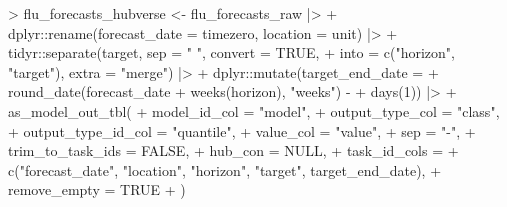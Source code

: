 \documentclass[
  letterpaper,
  DIV=11,
  numbers=noendperiod]{scrartcl}
\newenvironment{Shaded}{\begin{snugshade}}{\end{snugshade}}
\newcommand{\AttributeTok}[1]{\textcolor[rgb]{0.40,0.45,0.13}{#1}}
\newcommand{\ConstantTok}[1]{\textcolor[rgb]{0.56,0.35,0.01}{#1}}
\newcommand{\DecValTok}[1]{\textcolor[rgb]{0.68,0.00,0.00}{#1}}
\newcommand{\FunctionTok}[1]{\textcolor[rgb]{0.28,0.35,0.67}{#1}}
\newcommand{\NormalTok}[1]{\textcolor[rgb]{0.00,0.23,0.31}{#1}}
\newcommand{\OtherTok}[1]{\textcolor[rgb]{0.00,0.23,0.31}{#1}}
\newcommand{\SpecialCharTok}[1]{\textcolor[rgb]{0.37,0.37,0.37}{#1}}
\newcommand{\StringTok}[1]{\textcolor[rgb]{0.13,0.47,0.30}{#1}}
\begin{document}
\begin{Shaded}
\begin{Highlighting}[]
\SpecialCharTok{\textgreater{}}\NormalTok{ flu\_forecasts\_hubverse }\OtherTok{\textless{}{-}}\NormalTok{ flu\_forecasts\_raw }\SpecialCharTok{|\textgreater{}}
\SpecialCharTok{+}\NormalTok{   dplyr}\SpecialCharTok{::}\FunctionTok{rename}\NormalTok{(}\AttributeTok{forecast\_date =}\NormalTok{ timezero, }\AttributeTok{location =}\NormalTok{ unit) }\SpecialCharTok{|\textgreater{}}
\SpecialCharTok{+}\NormalTok{   tidyr}\SpecialCharTok{::}\FunctionTok{separate}\NormalTok{(target, }\AttributeTok{sep =} \StringTok{" "}\NormalTok{, }\AttributeTok{convert =} \ConstantTok{TRUE}\NormalTok{,}
\SpecialCharTok{+}                   \AttributeTok{into =} \FunctionTok{c}\NormalTok{(}\StringTok{"horizon"}\NormalTok{, }\StringTok{"target"}\NormalTok{), }\AttributeTok{extra =} \StringTok{"merge"}\NormalTok{) }\SpecialCharTok{|\textgreater{}}
\SpecialCharTok{+}\NormalTok{   dplyr}\SpecialCharTok{::}\FunctionTok{mutate}\NormalTok{(}\AttributeTok{target\_end\_date =} 
\SpecialCharTok{+}                   \FunctionTok{round\_date}\NormalTok{(forecast\_date }\SpecialCharTok{+} \FunctionTok{weeks}\NormalTok{(horizon), }\StringTok{"weeks"}\NormalTok{) }\SpecialCharTok{{-}}
\SpecialCharTok{+}                     \FunctionTok{days}\NormalTok{(}\DecValTok{1}\NormalTok{)) }\SpecialCharTok{|\textgreater{}}
\SpecialCharTok{+}   \FunctionTok{as\_model\_out\_tbl}\NormalTok{(}
\SpecialCharTok{+}     \AttributeTok{model\_id\_col =} \StringTok{"model"}\NormalTok{,}
\SpecialCharTok{+}     \AttributeTok{output\_type\_col =} \StringTok{"class"}\NormalTok{,}
\SpecialCharTok{+}     \AttributeTok{output\_type\_id\_col =} \StringTok{"quantile"}\NormalTok{,}
\SpecialCharTok{+}     \AttributeTok{value\_col =} \StringTok{"value"}\NormalTok{,}
\SpecialCharTok{+}     \AttributeTok{sep =} \StringTok{"{-}"}\NormalTok{,}
\SpecialCharTok{+}     \AttributeTok{trim\_to\_task\_ids =} \ConstantTok{FALSE}\NormalTok{,}
\SpecialCharTok{+}     \AttributeTok{hub\_con =} \ConstantTok{NULL}\NormalTok{,}
\SpecialCharTok{+}     \AttributeTok{task\_id\_cols =} 
\SpecialCharTok{+}       \FunctionTok{c}\NormalTok{(}\StringTok{"forecast\_date"}\NormalTok{, }\StringTok{"location"}\NormalTok{, }\StringTok{"horizon"}\NormalTok{, }\StringTok{"target"}\NormalTok{, target\_end\_date),}
\SpecialCharTok{+}     \AttributeTok{remove\_empty =} \ConstantTok{TRUE}
\SpecialCharTok{+}\NormalTok{   )}
\end{Highlighting}
\end{Shaded}
\end{document}
